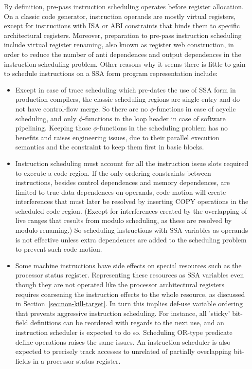By definition, pre-pass instruction scheduling operates before register
allocation. On a classic code generator, instruction operands are mostly virtual
registers, except for instructions with ISA or ABI constraints that binds them
to specific architectural registers. Moreover, preparation to pre-pass
instruction scheduling include virtual register renaming, also known as register
web construction, in order to reduce the number of anti dependences and output
dependences in the instruction scheduling problem. Other reasons why it seems
there is little to gain to schedule instructions on a SSA form program
representation include: \begin{itemize}

\item Except in case of trace scheduling which pre-dates the use of SSA form in
production compilers, the classic scheduling regions are single-entry and do not
have control-flow merge. So there are no $\phi$-functions in case of acyclic
scheduling, and only $\phi$-functions in the loop header in case of software
pipelining. Keeping those $\phi$-functions in the scheduling problem has no
benefits and raises engineering issues, due to their parallel execution
semantics and the constraint to keep them first in basic blocks.

\item Instruction scheduling must account for all the instruction issue slots
required to execute a code region. If the only ordering constraints between
instructions, besides control dependences and memory dependences, are limited to
true data dependences on operands, code motion will create interferences that
must later be resolved by inserting COPY operations in the scheduled code
region. (Except for interferences created by the overlapping of live ranges
that results from modulo scheduling, as these are resolved by modulo renaming.)
So scheduling instructions with SSA variables as operands is not effective
unless extra dependences are added to the scheduling problem to prevent such
code motion. 

\item Some machine instructions have side effects on special resources such as
the processor status register. Representing these resources as SSA variables
even though they are not operated like the processor architectural registers
requires coarsening the instruction effects to the whole resource, as discussed
in Section~\ref{sec:non-kill-target}. In turn this implies def-use variable
ordering that prevents aggressive instruction scheduling. For instance, all
'sticky' bit-field definitions can be reordered with regards to the next use,
and an instruction scheduler is expected to do so. Scheduling OR-type predicate
define operations \cite{Schlansker:1999:PLDI} raises the same issues. An
instruction scheduler is also expected to precisely track accesses to unrelated
of partially overlapping bit-fields in a processor status register.


\end{itemize}

